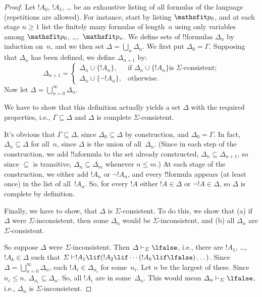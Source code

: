 \documentclass[../../../include/open-logic-section]{subfiles}
\begin{document}
\begin{proof}
Let $!A_0$, $!A_1$, \dots{} be an exhaustive listing of all formulas
of the language (repetitions are allowed). For instance, start by
listing $\Obj p_0$, and at each stage $n \ge 1$ list the finitely many
formulas of length~$n$ using only variables among $\Obj p_0$,
\dots,~$\Obj p_n$. We define sets of !!{formula}s $\Delta_n$ by
induction on~$n$, and we then set $\Delta = \bigcup_n \Delta_n$. We
first put $\Delta_0 = \Gamma$. Supposing that $\Delta_n$ has been
defined, we define $\Delta_{n+1}$ by:
\[
\Delta_{n+1} =
\begin{cases}
  \Delta_n \cup \{!A_n\}, & \text{if $\Delta_n \cup \{ !A_n\}$
    is $\Sigma$-consistent;} \\
  \Delta_n \cup \{ \lnot !A_n\}, & \text{otherwise.}
\end{cases}
\]
Now let $\Delta = \bigcup_{n=0}^\infty \Delta_n$.

We have to show that this definition actually yields a set $\Delta$
with the required properties, i.e., $\Gamma \subseteq \Delta$ and
$\Delta$ is complete $\Sigma$-consistent.

It's obvious that $\Gamma \subseteq \Delta$, since $\Delta_0 \subseteq
\Delta$ by construction, and $\Delta_0 = \Gamma$. In fact, $\Delta_n
\subseteq \Delta$ for all~$n$, since $\Delta$ is the union of
all~$\Delta_n$. (Since in each step of the construction, we add
!!a{formula} to the set already constructed, $\Delta_n \subseteq
\Delta_{n+1}$, so since $\subseteq$ is transitive, $\Delta_n \subseteq
\Delta_{m}$ whenever $n \le m$.)  At each stage of the construction, we
either add $!A_n$ or $\lnot !A_n$, and every !!{formula} appears (at
least once) in the list of all~$!A_n$. So, for every $!A$ either $!A
\in \Delta$ or $\lnot !A \in \Delta$, so $\Delta$ is complete by
definition.

Finally, we have to show, that $\Delta$ is $\Sigma$-consistent.  To do
this, we show that (a) if $\Delta$ were $\Sigma$-inconsistent, then
some $\Delta_n$ would be $\Sigma$-inconsistent, and (b) all $\Delta_n$
are $\Sigma$-consistent.

So suppose $\Delta$ were $\Sigma$-inconsistent. Then $\Delta
\Proves[\Sigma] \lfalse$, i.e., there are $!A_1$, \dots,~$!A_k \in
\Delta$ such that $\Sigma \Proves !A_1 \lif (!A_2 \lif \cdots (!A_k
\lif \lfalse)\dots)$. Since $\Delta = \bigcup_{n=0}^\infty \Delta_n$, each
$!A_i \in \Delta_{n_i}$ for some~$n_i$. Let $n$ be the largest of
these. Since $n_i \le n$, $\Delta_{n_i} \subseteq \Delta_n$. So, all
$!A_i$ are in some~$\Delta_n$. This would mean $\Delta_n
\Proves[\Sigma] \lfalse$, i.e., $\Delta_n$ is $\Sigma$-inconsistent.


\end{proof}
\end{document}
